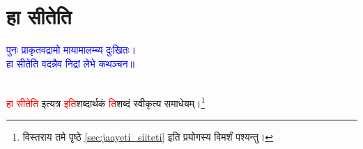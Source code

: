 \section[हा सीतेति]{हा सीतेति}
\centering\textcolor{blue}{पुनः प्राकृतवद्रामो मायामालम्ब्य दुःखितः।\nopagebreak\\
हा सीतेति वदन्नैव निद्रां लेभे कथञ्चन॥}\nopagebreak\\
\\
\begin{sloppypar}\justifying\noindent\hspace{10mm} \textcolor{red}{हा सीतेति} इत्यत्र \textcolor{red}{इति}\-शब्दार्थकं \textcolor{red}{ति}\-शब्दं स्वीकृत्य समाधेयम्।\footnote{विस्तराय \pageref{sec:jaayeti_siiteti}तमे पृष्ठे \ref{sec:jaayeti_siiteti}  इति प्रयोगस्य विमर्शं पश्यन्तु।}\end{sloppypar}
